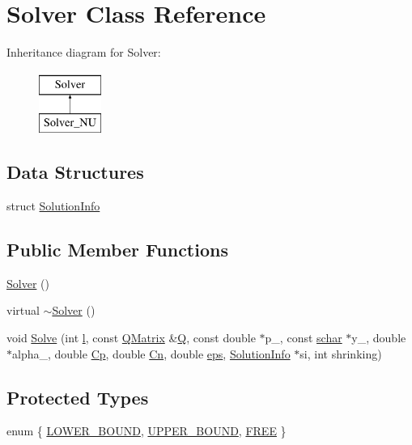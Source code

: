 \hypertarget{classSolver}{}\section{Solver Class Reference}
\label{classSolver}
Inheritance diagram for Solver\+:\begin{figure}[H]
\begin{center}
\leavevmode
\includegraphics[height=2.000000cm]{classSolver}
\end{center}
\end{figure}
\subsection*{Data Structures}
\begin{DoxyCompactItemize}
\item 
struct \hyperlink{structSolver_1_1SolutionInfo}{Solution\+Info}
\end{DoxyCompactItemize}
\subsection*{Public Member Functions}
\begin{DoxyCompactItemize}
\item 
\hyperlink{classSolver_a9dfe7ae9ce617e8a6398be34284c907a}{Solver} ()
\item 
virtual \hyperlink{classSolver_a14f7014dd6e46e3990dea30b5ad3c087}{$\sim$\+Solver} ()
\item 
void \hyperlink{classSolver_aa3ab5672a26826f9dc1ac9145620a823}{Solve} (int \hyperlink{classSolver_a88832d45b6de977b1cbb2afd4c0e494c}{l}, const \hyperlink{classQMatrix}{Q\+Matrix} \&\hyperlink{classSolver_a2d3461718f0570bdc47f5dfb31d61e0a}{Q}, const double $\ast$p\+\_\+, const \hyperlink{svm__core_8cpp_a0fd9ce9d735064461bebfe6037026093}{schar} $\ast$y\+\_\+, double $\ast$alpha\+\_\+, double \hyperlink{classSolver_a2e45dbea8be469bf8247e14768549dd5}{Cp}, double \hyperlink{classSolver_a38d741d194839fb445f982dd78e0b97b}{Cn}, double \hyperlink{classSolver_a718333cc2c1d40abf9c292a788cba1e5}{eps}, \hyperlink{structSolver_1_1SolutionInfo}{Solution\+Info} $\ast$si, int shrinking)
\end{DoxyCompactItemize}
\subsection*{Protected Types}
\begin{DoxyCompactItemize}
\item 
enum \{ \hyperlink{classSolver_ab8abfd7c2e958e4343d30e471b2f86a1aeb78558e05ec0672378c3e801e866560}{L\+O\+W\+E\+R\+\_\+\+B\+O\+U\+ND}, 
\hyperlink{classSolver_ab8abfd7c2e958e4343d30e471b2f86a1aef825a32b2471cdb0724cfa9c1f051fd}{U\+P\+P\+E\+R\+\_\+\+B\+O\+U\+ND}, 
\hyperlink{classSolver_ab8abfd7c2e958e4343d30e471b2f86a1a904f6af2170b6f900fbd3d46cd055c76}{F\+R\+EE}
 \}
\end{DoxyCompactItemize}
